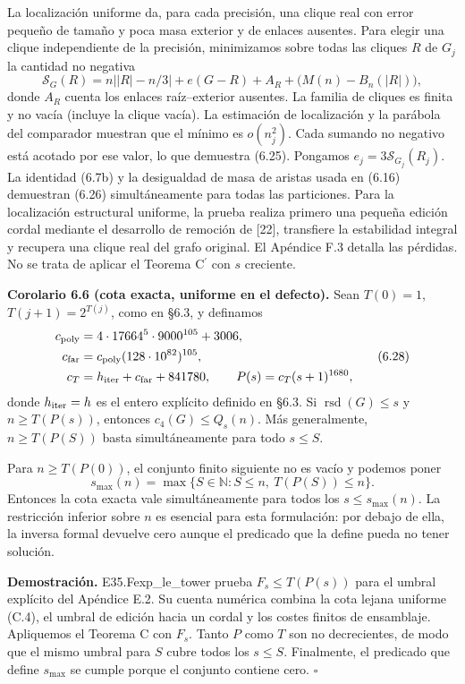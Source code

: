 \documentclass[spanish,11pt,a4paper]{article}
\begin{document}
La localización uniforme da, para cada precisión, una clique real con error pequeño de tamaño y poca masa exterior y de enlaces ausentes. Para elegir una clique independiente de la precisión, minimizamos sobre todas las cliques \(R\) de \(G_j\) la cantidad no negativa \[
\mathcal S_G(R)=n\bigl||R|-n/3\bigr|
 +e(G-R)+A_R+\bigl(M(n)-B_n(|R|)\bigr),
\tag{6.27}
\] donde \(A_R\) cuenta los enlaces raíz--exterior ausentes. La familia de cliques es finita y no vacía (incluye la clique vacía). La estimación de localización y la parábola del comparador muestran que el mínimo es \(o(n_j^2)\). Cada sumando no negativo está acotado por ese valor, lo que demuestra (6.25). Pongamos \(e_j=3\mathcal S_{G_j}(R_j)\). La identidad (6.7b) y la desigualdad de masa de aristas usada en (6.16) demuestran (6.26) simultáneamente para todas las particiones. Para la localización estructural uniforme, la prueba realiza primero una pequeña edición cordal mediante el desarrollo de remoción de {[}22{]}, transfiere la estabilidad integral y recupera una clique real del grafo original. El Apéndice F.3 detalla las pérdidas. No se trata de aplicar el Teorema \texorpdfstring{C\ensuremath{^{\prime}}}{C'} con \(s\) creciente.


\textbf{Corolario 6.6 (cota exacta, uniforme en el defecto).} Sean \(T(0)=1\), \(T(j+1)=2^{T(j)}\), como en §6.3, y definamos \[
\begin{aligned}
c_{\rm poly}&=4\cdot17664^5\cdot9000^{105}+3006,\\
c_{\rm far}&=c_{\rm poly}(128\cdot10^{82})^{105},\\
c_T&=h_{\rm iter}+c_{\rm far}+841780,\qquad
P(s)=c_T(s+1)^{1680},
\end{aligned}
\tag{6.28}
\] donde \(h_{\rm iter}=h\) es el entero explícito definido en §6.3. Si \(\operatorname{rsd}(G)\le s\) y \(n\ge T(P(s))\), entonces \(c_4(G)\le Q_s(n)\). Más generalmente, \(n\ge T(P(S))\) basta simultáneamente para todo \(s\le S\).

Para \(n\ge T(P(0))\), el conjunto finito siguiente no es vacío y podemos poner \[
s_{\max}(n)=\max\{S\in\mathbb N:S\le n,\ T(P(S))\le n\}.
\tag{6.29}
\] Entonces la cota exacta vale simultáneamente para todos los \(s\le s_{\max}(n)\). La restricción inferior sobre \(n\) es esencial para esta formulación: por debajo de ella, la inversa formal devuelve cero aunque el predicado que la define pueda no tener solución.

\textbf{Demostración.} {\ttfamily\small E35.\discretionary{\hbox{\ensuremath{\hookrightarrow}}}{}{}Fexp\_\discretionary{\hbox{\ensuremath{\hookrightarrow}}}{}{}le\_\discretionary{\hbox{\ensuremath{\hookrightarrow}}}{}{}tower} prueba \(F_s\le T(P(s))\) para el umbral explícito del Apéndice E.2. Su cuenta numérica combina la cota lejana uniforme (C.4), el umbral de edición hacia un cordal y los costes finitos de ensamblaje. Apliquemos el Teorema C con \(F_s\). Tanto \(P\) como \(T\) son no decrecientes, de modo que el mismo umbral para \(S\) cubre todos los \(s\le S\). Finalmente, el predicado que define \(s_{\max}\) se cumple porque el conjunto contiene cero. \(\square\)
\end{document}
